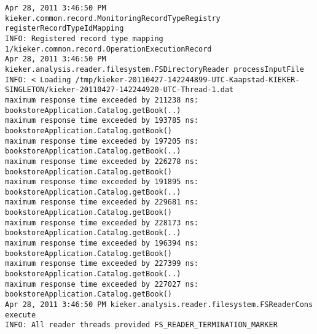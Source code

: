\setTextListing
\begin{lstlisting}[caption=Execution of the example analysis (Section~\ref{sec:example:analysis})]
Apr 28, 2011 3:46:50 PM kieker.common.record.MonitoringRecordTypeRegistry registerRecordTypeIdMapping
INFO: Registered record type mapping 1/kieker.common.record.OperationExecutionRecord
Apr 28, 2011 3:46:50 PM kieker.analysis.reader.filesystem.FSDirectoryReader processInputFile
INFO: < Loading /tmp/kieker-20110427-142244899-UTC-Kaapstad-KIEKER-SINGLETON/kieker-20110427-142244920-UTC-Thread-1.dat
maximum response time exceeded by 211238 ns: bookstoreApplication.Catalog.getBook(..)
maximum response time exceeded by 193785 ns: bookstoreApplication.Catalog.getBook()
maximum response time exceeded by 197205 ns: bookstoreApplication.Catalog.getBook(..)
maximum response time exceeded by 226278 ns: bookstoreApplication.Catalog.getBook()
maximum response time exceeded by 191895 ns: bookstoreApplication.Catalog.getBook(..)
maximum response time exceeded by 229681 ns: bookstoreApplication.Catalog.getBook()
maximum response time exceeded by 228173 ns: bookstoreApplication.Catalog.getBook(..)
maximum response time exceeded by 196394 ns: bookstoreApplication.Catalog.getBook()
maximum response time exceeded by 227399 ns: bookstoreApplication.Catalog.getBook(..)
maximum response time exceeded by 227027 ns: bookstoreApplication.Catalog.getBook()
Apr 28, 2011 3:46:50 PM kieker.analysis.reader.filesystem.FSReaderCons execute
INFO: All reader threads provided FS_READER_TERMINATION_MARKER
\end{lstlisting}
